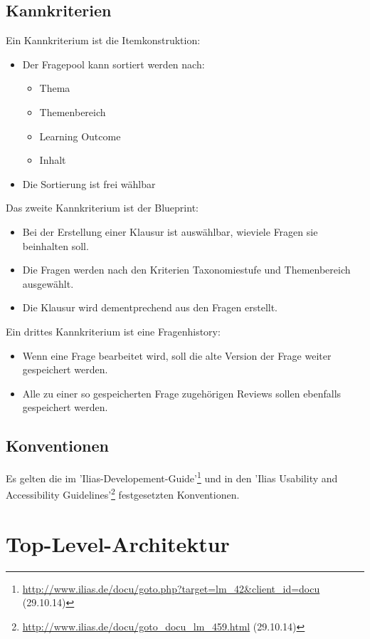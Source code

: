 \documentclass[a4paper]{scrreprt}
\begin{document}
\section{Kannkriterien}
Ein Kannkriterium ist die Itemkonstruktion:
\begin{itemize}
\item Der Fragepool kann sortiert werden nach:
\begin{itemize}
\item Thema
\item Themenbereich
\item Learning Outcome
\item Inhalt
\end{itemize}
\item Die Sortierung ist frei wählbar
\end{itemize}
Das zweite Kannkriterium ist der Blueprint:
\begin{itemize}
\item Bei der Erstellung einer Klausur ist auswählbar, wieviele Fragen sie beinhalten soll.
\item Die Fragen werden nach den Kriterien Taxonomiestufe und Themenbereich ausgewählt. 
\item Die Klausur wird dementprechend aus den Fragen erstellt.
\end{itemize}
Ein drittes Kannkriterium ist eine Fragenhistory:
\begin{itemize}
\item Wenn eine Frage bearbeitet wird, soll die alte Version der Frage weiter gespeichert werden.
\item Alle zu einer so gespeicherten Frage zugehörigen Reviews sollen ebenfalls gespeichert werden.
\end{itemize}



\section{Konventionen}
Es gelten die im 'Ilias-Developement-Guide'\footnote{\url{http://www.ilias.de/docu/goto.php?target=lm_42&client_id=docu} (29.10.14)} und in den 'Ilias Usability and Accessibility Guidelines'\footnote{\url{http://www.ilias.de/docu/goto_docu_lm_459.html} (29.10.14)} festgesetzten Konventionen.

\chapter{Top-Level-Architektur}
\end{document}

